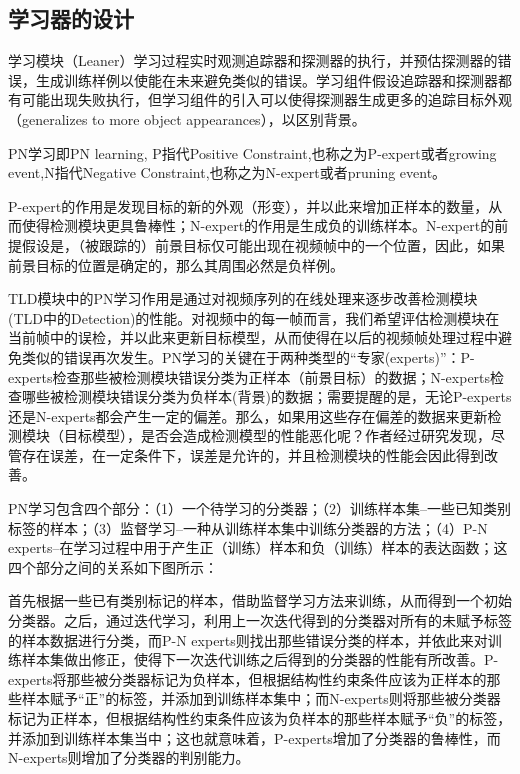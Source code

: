 \subsection{学习器的设计}
学习模块（Leaner）学习过程实时观测追踪器和探测器的执行，并预估探测器的错误，生成训练样例以使能在未来避免类似的错误。学习组件假设追踪器和探测器都有可能出现失败执行，但学习组件的引入可以使得探测器生成更多的追踪目标外观（generalizes to more object appearances），以区别背景。

PN学习即PN learning, P指代Positive Constraint,也称之为P-expert或者growing event,N指代Negative Constraint,也称之为N-expert或者pruning event。

P-expert的作用是发现目标的新的外观（形变），并以此来增加正样本的数量，从而使得检测模块更具鲁棒性；N-expert的作用是生成负的训练样本。N-expert的前提假设是，（被跟踪的）前景目标仅可能出现在视频帧中的一个位置，因此，如果前景目标的位置是确定的，那么其周围必然是负样例。

TLD模块中的PN学习作用是通过对视频序列的在线处理来逐步改善检测模块(TLD中的Detection)的性能。对视频中的每一帧而言，我们希望评估检测模块在当前帧中的误检，并以此来更新目标模型，从而使得在以后的视频帧处理过程中避免类似的错误再次发生。PN学习的关键在于两种类型的“专家(experts)”：P-experts检查那些被检测模块错误分类为正样本（前景目标）的数据；N-experts检查哪些被检测模块错误分类为负样本(背景)的数据；需要提醒的是，无论P-experts还是N-experts都会产生一定的偏差。那么，如果用这些存在偏差的数据来更新检测模块（目标模型），是否会造成检测模型的性能恶化呢？作者经过研究发现，尽管存在误差，在一定条件下，误差是允许的，并且检测模块的性能会因此得到改善。

PN学习包含四个部分：（1）一个待学习的分类器；（2）训练样本集–一些已知类别标签的样本；（3）监督学习–一种从训练样本集中训练分类器的方法；（4）P-N experts–在学习过程中用于产生正（训练）样本和负（训练）样本的表达函数；这四个部分之间的关系如下图所示：

首先根据一些已有类别标记的样本，借助监督学习方法来训练，从而得到一个初始分类器。之后，通过迭代学习，利用上一次迭代得到的分类器对所有的未赋予标签的样本数据进行分类，而P-N experts则找出那些错误分类的样本，并依此来对训练样本集做出修正，使得下一次迭代训练之后得到的分类器的性能有所改善。P-experts将那些被分类器标记为负样本，但根据结构性约束条件应该为正样本的那些样本赋予“正”的标签，并添加到训练样本集中；而N-experts则将那些被分类器标记为正样本，但根据结构性约束条件应该为负样本的那些样本赋予“负”的标签，并添加到训练样本集当中；这也就意味着，P-experts增加了分类器的鲁棒性，而N-experts则增加了分类器的判别能力。

